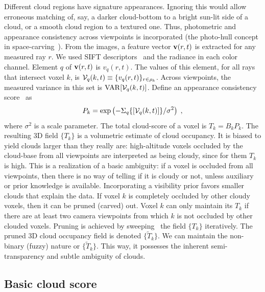 \documentclass[runningheads]{llncs}
\begin{document}
Different cloud regions have signature appearances. Ignoring this would allow erroneous matching of, say, a darker cloud-bottom to a bright sun-lit side of a cloud, or a smooth cloud region to a textured one. Thus, photometric and appearance consistency across viewpoints is incorporated (the photo-hull concept in space-carving~\cite{Kutulakos2000}).
From the images, a feature vector ${\bf v}(r,t)$ is extracted for any measured ray $r$.
We used SIFT descriptors~\cite{lowe2004distinctive} and the radiance in each color channel. Element $q$ of ${\bf v}(r,t)$ is $v_q(r,t)$. The values of this element, for all rays that intersect voxel $k$, is \mbox{${\cal V}_q(k,t)\equiv\{v_q(r,t)\}_{r\in\rho_k}$}.
Across viewpoints, the measured variance in this set is
${\rm VAR}[{\cal V}_q(k,t)]$. Define an appearance consistency score~\cite{Supp2014} as
\begin{equation}
 P_k= \exp\left(
         -\Sigma_q\{[{\cal V}_q(k,t)]\}/\sigma^2
         \right)
  \;,
 \label{eq:Dist}
\end{equation}
where $\sigma^2$ is a scale parameter. The total cloud-score of a voxel is \mbox{$T_k=B_kP_k$}.
The resulting 3D field $\{T_k\}$ is a volumetric estimate of cloud occupancy. It is biased to yield clouds larger than they really are: high-altitude voxels occluded by the cloud-base from all viewpoints are interpreted as being cloudy, since for them $T_k$ is high. This is a realization of a basic ambiguity: if a voxel is occluded from all viewpoints, then there is no way of telling if it is cloudy or not, unless auxiliary or prior knowledge is available. Incorporating a visibility prior favors smaller clouds that explain the data. If voxel $k$ is completely occluded by other cloudy voxels, then it can be pruned (carved) out. Voxel $k$ can only maintain its $T_k$ if there are at least two camera viewpoints from which $k$ is not occluded by other clouded voxels. Pruning is achieved by sweeping~\cite{Kutulakos2000} the field $\{T_k\}$ iteratively. The pruned 3D cloud occupancy field is denoted $\{\tilde T_k\}$. We can maintain the non-binary (fuzzy) nature or $\{\tilde T_k\}$. This way, it possesses the inherent semi-transparency and subtle ambiguity of clouds.

\subsection*{Basic cloud score}
\label{sec:cloudscore}
\end{document}
